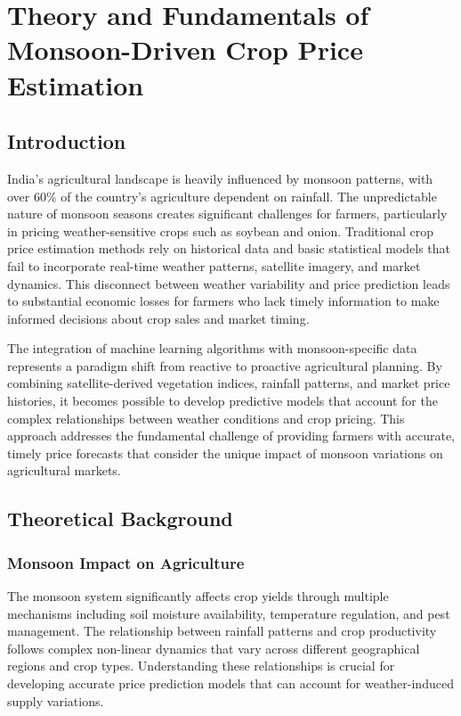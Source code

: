 
\chapter{Theory and Fundamentals of Monsoon-Driven Crop Price Estimation}

\section{Introduction}

India's agricultural landscape is heavily influenced by monsoon patterns, with over 60\% of the country's agriculture dependent on rainfall. The unpredictable nature of monsoon seasons creates significant challenges for farmers, particularly in pricing weather-sensitive crops such as soybean and onion. Traditional crop price estimation methods rely on historical data and basic statistical models that fail to incorporate real-time weather patterns, satellite imagery, and market dynamics. This disconnect between weather variability and price prediction leads to substantial economic losses for farmers who lack timely information to make informed decisions about crop sales and market timing.

The integration of machine learning algorithms with monsoon-specific data represents a paradigm shift from reactive to proactive agricultural planning. By combining satellite-derived vegetation indices, rainfall patterns, and market price histories, it becomes possible to develop predictive models that account for the complex relationships between weather conditions and crop pricing. This approach addresses the fundamental challenge of providing farmers with accurate, timely price forecasts that consider the unique impact of monsoon variations on agricultural markets.

\section{Theoretical Background}

\subsection{Monsoon Impact on Agriculture}

The monsoon system significantly affects crop yields through multiple mechanisms including soil moisture availability, temperature regulation, and pest management. The relationship between rainfall patterns and crop productivity follows complex non-linear dynamics that vary across different geographical regions and crop types. Understanding these relationships is crucial for developing accurate price prediction models that can account for weather-induced supply variations.

